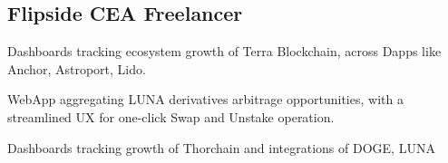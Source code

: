 \subsection*{Flipside CEA \hfill Freelancer}
    \begin{zitemize}
        \item Dashboards tracking ecosystem growth of Terra Blockchain, across Dapps like Anchor, Astroport, Lido. 
        \item WebApp aggregating LUNA derivatives arbitrage opportunities, with a streamlined UX for one-click Swap and Unstake operation. 
        \item Dashboards tracking growth of Thorchain and integrations of DOGE, LUNA
    \end{zitemize}
    

